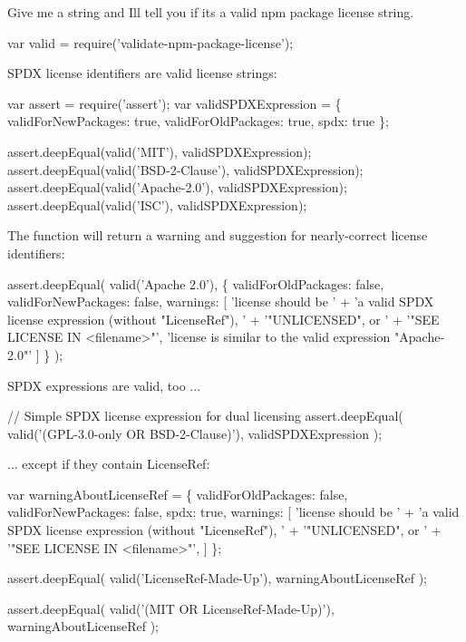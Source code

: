 Give me a string and I\textquotesingle{}ll tell you if it\textquotesingle{}s a valid npm package license string.


\begin{DoxyCode}
var valid = require('validate-npm-package-license');
\end{DoxyCode}


S\+P\+DX license identifiers are valid license strings\+:


\begin{DoxyCode}
var assert = require('assert');
var validSPDXExpression = \{
  validForNewPackages: true,
  validForOldPackages: true,
  spdx: true
\};

assert.deepEqual(valid('MIT'), validSPDXExpression);
assert.deepEqual(valid('BSD-2-Clause'), validSPDXExpression);
assert.deepEqual(valid('Apache-2.0'), validSPDXExpression);
assert.deepEqual(valid('ISC'), validSPDXExpression);
\end{DoxyCode}
 The function will return a warning and suggestion for nearly-\/correct license identifiers\+:


\begin{DoxyCode}
assert.deepEqual(
  valid('Apache 2.0'),
  \{
    validForOldPackages: false,
    validForNewPackages: false,
    warnings: [
      'license should be ' +
      'a valid SPDX license expression (without "LicenseRef"), ' +
      '"UNLICENSED", or ' +
      '"SEE LICENSE IN <filename>"',
      'license is similar to the valid expression "Apache-2.0"'
    ]
  \}
);
\end{DoxyCode}


S\+P\+DX expressions are valid, too ...


\begin{DoxyCode}
// Simple SPDX license expression for dual licensing
assert.deepEqual(
  valid('(GPL-3.0-only OR BSD-2-Clause)'),
  validSPDXExpression
);
\end{DoxyCode}


... except if they contain {\ttfamily License\+Ref}\+:


\begin{DoxyCode}
var warningAboutLicenseRef = \{
  validForOldPackages: false,
  validForNewPackages: false,
  spdx: true,
  warnings: [
    'license should be ' +
    'a valid SPDX license expression (without "LicenseRef"), ' +
    '"UNLICENSED", or ' +
    '"SEE LICENSE IN <filename>"',
  ]
\};

assert.deepEqual(
  valid('LicenseRef-Made-Up'),
  warningAboutLicenseRef
);

assert.deepEqual(
  valid('(MIT OR LicenseRef-Made-Up)'),
  warningAboutLicenseRef
);
\end{DoxyCode}


